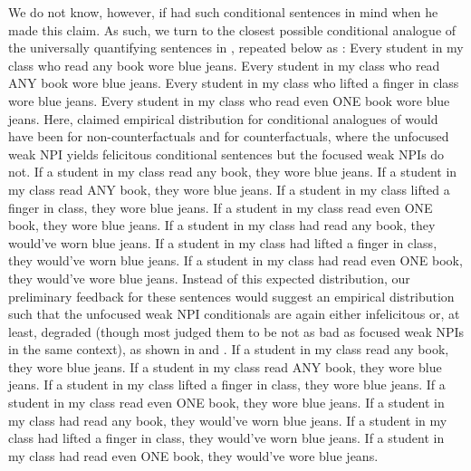 We do not know, however, if \textcite{Crnic2014-dogma} had such conditional sentences in mind when he made this claim. As such, we turn to the closest possible conditional analogue of the universally quantifying sentences in , repeated below as :
\pex\label{ex:npi-every-bad-condch}
\a Every student in my class who read any book wore blue jeans.
\a\ljudge{\#} Every student in my class who read \MakeUppercase{any} book wore blue jeans.
\a\ljudge{\#} Every student in my class who lifted a finger in class wore blue jeans.
\a\ljudge{\#} Every student in my class who read even \MakeUppercase{one} book wore blue jeans.
\xe
Here,  claimed empirical distribution for conditional analogues of  would have been  for non-counterfactuals and  for counterfactuals, where the unfocused weak NPI yields felicitous conditional sentences but the focused weak NPIs do not.
\pex\label{ex:npi-every-bad-analogue}
\a\ljudge{} If a student in my class read any book, they wore blue jeans.
\a\ljudge{\#} If a student in my class read \MakeUppercase{any} book, they wore blue jeans.
\a\ljudge{\#} If a student in my class lifted a finger in class, they wore blue jeans.
\a\ljudge{\#} If a student in my class read even \MakeUppercase{one} book, they wore blue jeans.
\xe
\pex\label{ex:npi-every-bad-analogue2}
\a\ljudge{} If a student in my class had read any book, they would've worn blue jeans.
\a\ljudge{\#} 
\a\ljudge{\#} If a student in my class had lifted a finger in class, they would've worn blue jeans.
\a\ljudge{\#} If a student in my class had read even \MakeUppercase{one} book, they would've wore blue jeans.
\xe
Instead of this expected distribution, our preliminary feedback for these sentences would suggest an empirical distribution such that the unfocused weak NPI conditionals are again either infelicitous or, at least, degraded (though most judged them to be not as bad as focused weak NPIs in the same context), as shown in  and .
\pex\label{ex:npi-every-bad-analogue3}
\a\ljudge{\%} If a student in my class read any book, they wore blue jeans.
\a\ljudge{\#} If a student in my class read \MakeUppercase{any} book, they wore blue jeans.
\a\ljudge{\#} If a student in my class lifted a finger in class, they wore blue jeans.
\a\ljudge{\#} If a student in my class read even \MakeUppercase{one} book, they wore blue jeans.
\xe
\pex\label{ex:npi-every-bad-analogue4}
\a\ljudge{\%} If a student in my class had read any book, they would've worn blue jeans.
\a\ljudge{\#} 
\a\ljudge{\#} If a student in my class had lifted a finger in class, they would've worn blue jeans.
\a\ljudge{\#} If a student in my class had read even \MakeUppercase{one} book, they would've wore blue jeans.
\xe

